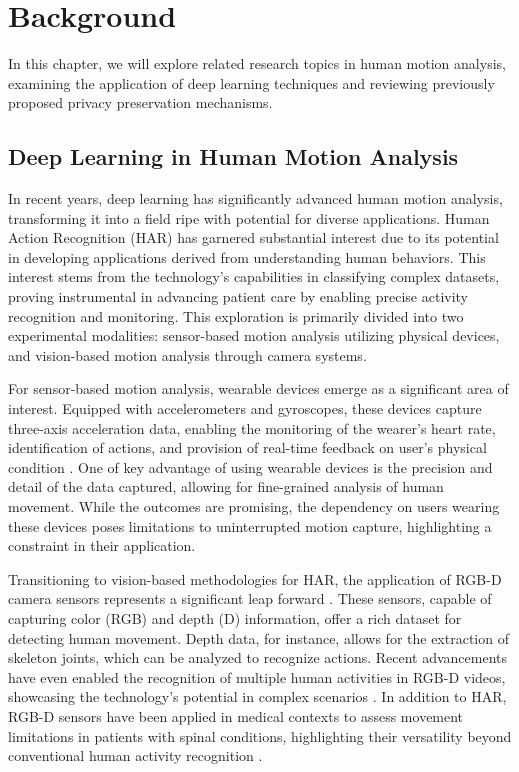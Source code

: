 \documentclass{l4proj}
\begin{document}
\chapter{Background}
In this chapter, we will explore related research topics in human motion analysis, examining the application of deep learning techniques and reviewing previously proposed privacy preservation mechanisms.

\section{Deep Learning in Human Motion Analysis}
In recent years, deep learning has significantly advanced human motion analysis, transforming it into a field ripe with potential for diverse applications. Human Action Recognition (HAR) has garnered substantial interest due to its potential in developing applications derived from understanding human behaviors. This interest stems from the technology's capabilities in classifying complex datasets, proving instrumental in advancing patient care by enabling precise activity recognition and monitoring. This exploration is primarily divided into two experimental modalities: sensor-based motion analysis utilizing physical devices, and vision-based motion analysis through camera systems.

For sensor-based motion analysis, wearable devices emerge as a significant area of interest. Equipped with accelerometers and gyroscopes, these devices capture three-axis acceleration data, enabling the monitoring of the wearer's heart rate, identification of actions, and provision of real-time feedback on user's physical condition \citep{accurate-human-activity-recognition-wearable-devices}. One of key advantage of using wearable devices is the precision and detail of the data captured, allowing for fine-grained analysis of human movement. While the outcomes are promising, the dependency on users wearing these devices poses limitations to uninterrupted motion capture, highlighting a constraint in their application.

Transitioning to vision-based methodologies for HAR, the application of RGB-D camera sensors represents a significant leap forward \citep{HAR_using_RGB-D, HAR_using_RGB-D-2}. These sensors, capable of capturing color (RGB) and depth (D) information, offer a rich dataset for detecting human movement. Depth data, for instance, allows for the extraction of skeleton joints, which can be analyzed to recognize actions. Recent advancements have even enabled the recognition of multiple human activities in RGB-D videos, showcasing the technology's potential in complex scenarios \citep{Mukherjee2018HumanAR}. In addition to HAR, RGB-D sensors have been applied in medical contexts to assess movement limitations in patients with spinal conditions, highlighting their versatility beyond conventional human activity recognition \citep{human-motion-capture-RGB-D-camera-motion-limitation}.
\end{document}

